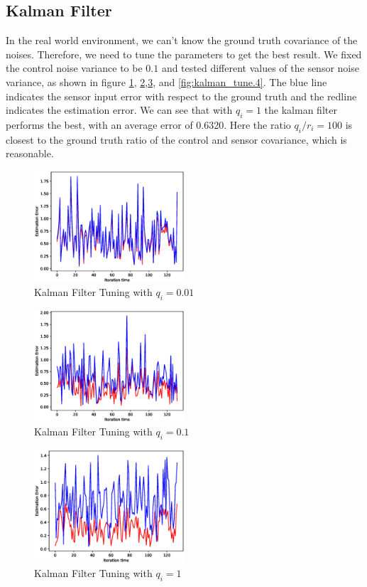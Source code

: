 \documentclass[letterpaper,11pt]{article}
\begin{document}
\subsection{Kalman Filter}
In the real world environment, we can't know the ground truth covariance of the noises. Therefore, we need to tune the parameters to get the best result. We fixed the control noise variance to be $0.1$ and tested different values of the sensor noise variance, as shown in figure \ref{fig:kalman_tune.1}, \ref{fig:kalman_tune.2},\ref{fig:kalman_tune.3}, and \ref{fig:kalman_tune.4}. The blue line indicates the sensor input error with respect to the ground truth and the redline indicates the estimation error. We can see that with $q_i = 1$ the kalman filter performs the best, with an average error of 0.6320. Here the ratio $q_i/r_i = 100$ is closest to the ground truth ratio of the control and sensor covariance, which is reasonable.
\begin{figure}[ht] 
	\centering
	\includegraphics[width=0.5\textwidth]{./kalman_0.01.eps}
	\caption{Kalman Filter Tuning with $q_i=0.01$}
	\label{fig:kalman_tune.1}
\end{figure}
\begin{figure}[ht] 
	\centering
	\includegraphics[width=0.5\textwidth]{./kalman_0.1.eps}
	\caption{Kalman Filter Tuning with $q_i=0.1$}
	\label{fig:kalman_tune.2}
\end{figure}
\begin{figure}[ht] 
	\centering
	\includegraphics[width=0.5\textwidth]{./kalman_1.eps}
	\caption{Kalman Filter Tuning with $q_i=1$}
	\label{fig:kalman_tune.3}
\end{figure}
\end{document}
